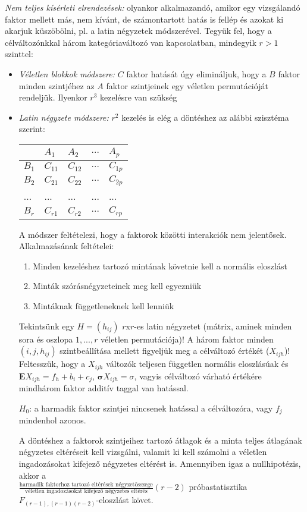 \emph{Nem teljes kísérleti elrendezések:} olyankor alkalmazandó, amikor egy vizsgálandó faktor mellett más, nem kívánt, de számontartott hatás is fellép és azokat ki akarjuk küszöbölni, pl. a latin négyzetek módszerével. Tegyük fel, hogy a célváltozónkkal három kategóriaváltozó van kapcsolatban, mindegyik $r>1$ szinttel:
\begin{itemize}
\item \emph{Véletlen blokkok módszere:} $C$ faktor hatását úgy elimináljuk, hogy a $B$ faktor minden szintjéhez az $A$ faktor szintjeinek egy véletlen permutációját rendeljük. Ilyenkor $r^3$ kezelésre van szükség
\item \emph{Latin négyzete módszere:} $r^2$ kezelés is elég a döntéshez az alábbi szisztéma szerint:

\begin{table}[h]
\centering
\begin{tabular}{|l|l|l|l|l|}
\hline
 & $A_1$ & $A_2$ & $...$ & $A_p$
\\ \hline
$B_1$ & $C_{11}$ & $C_{12}$ & $...$ & $C_{1p}$
\\ \hline
$B_2$ & $C_{21}$ & $C_{22}$ & $...$ & $C_{2p}$
\\ \hline
... & ...& ...&...& ...
\\ \hline
$B_r$ & $C_{r1}$ & $C_{r2}$ & $...$ & $C_{rp}$
\\ \hline
\end{tabular}
\end{table}

A módszer feltételezi, hogy a faktorok közötti interakciók nem jelentősek. Alkalmazásának feltételei:
\begin{enumerate}
\item Minden kezeléshez tartozó mintának követnie kell a normális eloszlást
\item Minták szórásnégyzeteinek meg kell egyezniük
\item Mintáknak függetleneknek kell lenniük
\end{enumerate}

Tekintsünk egy $H=(h_{ij})$ $r$x$r$-es latin négyzetet (mátrix, aminek minden sora és oszlopa $1,...,r$ véletlen permutációja)! A három faktor minden $(i, j, h_{ij})$ szintbeállítása mellett figyeljük meg a célváltozó értékét ($X_{ijh}$)! Feltesszük, hogy a $X_{ijh}$ változók teljesen független normális eloszlásúak és $\mathbf{E}X_{ijh}=f_h+b_i+c_j$, $\mathbf{\sigma}X_{ijh}=\sigma$, vagyis célváltozó várható értékére mindhárom faktor additív taggal van hatással.

$H_0$: a harmadik faktor szintjei nincsenek hatással a célváltozóra, vagy $f_j$ mindenhol azonos.

A döntéshez a faktorok szintjeihez tartozó átlagok és a minta teljes átlagának négyzetes eltéréseit kell vizsgálni, valamit ki kell számolni a véletlen ingadozásokat kifejező négyzetes eltérést is. Amennyiben igaz a nullhipotézis, akkor a \\$\frac{\text{harmadik faktorhoz tartozó eltérések négyzetösszege}}{\text{véletlen ingadozásokat kifejező négyzetes eltérés}}(r-2)$ próbastatisztika \\$F_{(r-1),(r-1)(r-2)}$-eloszlást követ.

\end{itemize}

